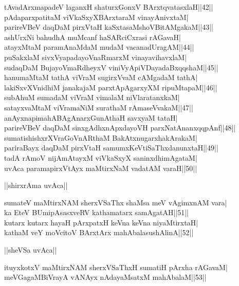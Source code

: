 \documentclass{article}
\begin{document}
tAvadArxmapadeV laganxH shaturxGonxV BArxtqvatasxlaH||42||\\
pAdaparxpatitaM viVkaSxyXBArxtaraM vinayAnivxtaM|\\
parireVBeV daqDaM pirxVtaH kaSxtasaMshoVBitAMgakaM||43||\\
ashUrxNi bahudhA muMcanf haSARciCxrasi rAGavaH|\\
atayxMtaM paramAnaMdaM mudaM vacanadUragAM||44||\\
puSakxlaM sivxVyapadayoVnaRmarxM vinayavihavxlaM|\\
sudaqDaM BujayoVmaRdheyxV viniVyApiVDayadaBxqqshaM||45||\\
hanumaMtaM tathA viVraM sugirxVvaM cAMgadaM tathA|\\
lakiSxvXVnidhiM janakajaM parxtApAgarxyXM ripuMtapaM||46||\\
subAhuM sumadaM viVraM vimalaM niVlaratanxkaM|\\
satayxvaMtaM viVramaNiM surathaM rAmaseVvakaM||47||\\
anAyxnapimahABAgAnarxGunAthaH savxyaM tataH|\\
parireVBeV daqDaM sinxgAdhxnApxdayoVH parxNatAnanxqqpAnf||48||\\
sumatishishxrXVraGoVnARthaM BakAtxnugarxhakArakaM|\\
pariraBayx daqDaM pirxVtaH samumxKeVtiSaThxdanunxtaH||49||\\
tadA rAmoV nijAmAtayxM viVkaSxyX saninxdhimAgataM|\\
uvAca paramapirxVtAyx maMtirxNaM vadatAM varaH||50||\\

\begin{center}
||shirxrAma uvAca||
\end{center}

sumateV maMtirxNAM sherxVSaThx shaMsa meV vAgimxnAM vara|\\
ka EteV BUmipAsasxveRV kathamatarx samAgatAH||51||\\
kutarx kutarx hayaH pArxpatxH keVna keVna niyaMtirxtaH|\\
kathaM veY moVcitoV BArxtArx mahAbalasushAlinA||52||\\

\begin{center}
||sheVSa uvAca||
\end{center}

ituyxkotxV maMtirxNAM sherxVSaThxH sumatiH pArxha rAGavaM|\\
meVGagaMBiVrayA vANAyx nAdayaMsatxM mahAbalaM||53||\\
\end{document}
